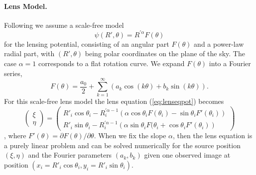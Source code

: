 \paragraph{Lens Model.} Following \citet{EvansWitt} we assume a scale-free model
\begin{equation*}
\psi(R',\theta) = R^{'\alpha} F(\theta) \label{eq:scalefreemodel}
\end{equation*}
for the lensing potential, consisting of an angular part $F(\theta)$ and a power-law radial part, with $(R',\theta)$ being polar coordinates on the plane of the sky. The case $\alpha = 1$ corresponds to a flat rotation curve. We expand $F(\theta)$ into a Fourier series,
\begin{equation}
F(\theta) = \frac{a_0}{2} + \sum_{k=1}^{\infty} \left(a_k \cos(k\theta) + b_k \sin (k\theta) \right). \label{eq:Fourieransatz}
\end{equation}
For this scale-free lens model the lens equation (\ref{eq:lenseqpot}) becomes
\begin{equation}
\begin{pmatrix} \xi \\ \eta \end{pmatrix} = \begin{pmatrix} R'_i \cos \theta_i - R_i^{'\alpha-1} \left(\alpha \cos \theta_i F(\theta_i) - \sin \theta_i F'(\theta_i) \right) \\ R'_i \sin \theta_i - R_i^{'\alpha-1} \left(\alpha \sin \theta_i F(\theta_i + \cos \theta_i F'(\theta_i) \right)\end{pmatrix}\label{eq:Fourierlenseq}
\end{equation}
\citep{EvansWitt}, where $F'(\theta) = \partial F(\theta) / \partial \theta$. When we fix the slope $\alpha$, then the lens equation is a purely linear problem and can be solved numerically for the source position $(\xi,\eta)$ and the Fourier parameters $(a_k,b_k)$ given one observed image at position $(x_i=R'_i \cos \theta_i,y_i=R'_i \sin \theta_i)$. 

